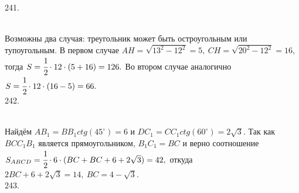 \documentclass[12pt]{article}
\begin{document}
241. \begin{figure}[ht!]
\end{figure}\\
Возможны два случая: треугольник может быть остроугольным или тупоугольным. В первом случае $AH=\sqrt{13^2-12^2}=5,\ CH=\sqrt{20^2-12^2}=16,$ тогда $S=\cfrac{1}{2}\cdot12\cdot(5+16)=126.$ Во втором случае аналогично $S=\cfrac{1}{2}\cdot12\cdot(16-5)=66.$\\
242. \begin{figure}[ht!]
\end{figure}\\
Найдём $AB_1=BB_1 ctg(45^\circ)=6$ и $DC_1=CC_1 ctg(60^\circ)=2\sqrt{3}.$ Так как $BCC_1B_1$ является прямоугольником, $B_1C_1=BC$ и верно соотношение
$S_{ABCD}=\cfrac{1}{2}\cdot6\cdot(BC+BC+6+2\sqrt{3})=42,$ откуда $2BC+6+2\sqrt{3}=14,\ BC=4-\sqrt{3}.$\\
243. \begin{figure}[ht!]
\end{figure}\\
\end{document}

